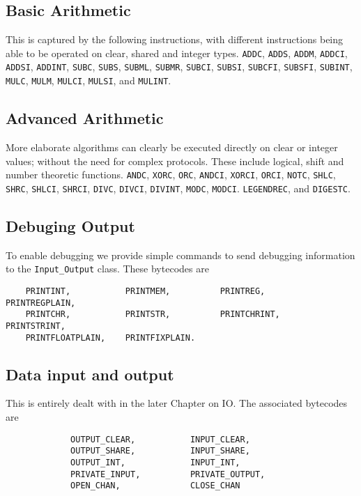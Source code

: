 \subsection{Basic Arithmetic}
This is captured by the following instructions,
with different instructions being able to be operated
on clear, shared and integer types.
    \verb+ADDC+,
    \verb+ADDS+,
    \verb+ADDM+,
    \verb+ADDCI+,
    \verb+ADDSI+,
    \verb+ADDINT+,
    \verb+SUBC+,
    \verb+SUBS+,
    \verb+SUBML+,
    \verb+SUBMR+,
    \verb+SUBCI+,
    \verb+SUBSI+,
    \verb+SUBCFI+,
    \verb+SUBSFI+,
    \verb+SUBINT+,
    \verb+MULC+,
    \verb+MULM+,
    \verb+MULCI+,
    \verb+MULSI+,
and
    \verb+MULINT+.

\subsection{Advanced Arithmetic}
More elaborate algorithms can clearly be executed directly on
clear or integer values; without the need for complex
protocols. These include logical, shift and number
theoretic functions.
    \verb+ANDC+,
    \verb+XORC+,
    \verb+ORC+,
    \verb+ANDCI+,
    \verb+XORCI+,
    \verb+ORCI+,
    \verb+NOTC+,
    \verb+SHLC+,
    \verb+SHRC+,
    \verb+SHLCI+,
    \verb+SHRCI+,
    \verb+DIVC+,
    \verb+DIVCI+,
    \verb+DIVINT+,
    \verb+MODC+,
    \verb+MODCI+.
    \verb+LEGENDREC+,
and
    \verb+DIGESTC+.

\subsection{Debuging Output}
To enable debugging we provide simple commands to send
debugging information to the \verb+Input_Output+ class.
These bytecodes are
\begin{verbatim}
    PRINTINT,           PRINTMEM,          PRINTREG,           PRINTREGPLAIN,
    PRINTCHR,           PRINTSTR,          PRINTCHRINT,        PRINTSTRINT,
    PRINTFLOATPLAIN,    PRINTFIXPLAIN.
\end{verbatim}

\subsection{Data input and output}
This is entirely dealt with in the later Chapter on IO.
The associated bytecodes are
\begin{verbatim}
             OUTPUT_CLEAR,           INPUT_CLEAR, 
             OUTPUT_SHARE,           INPUT_SHARE, 
             OUTPUT_INT,             INPUT_INT,
             PRIVATE_INPUT,          PRIVATE_OUTPUT,
             OPEN_CHAN,              CLOSE_CHAN
\end{verbatim}

